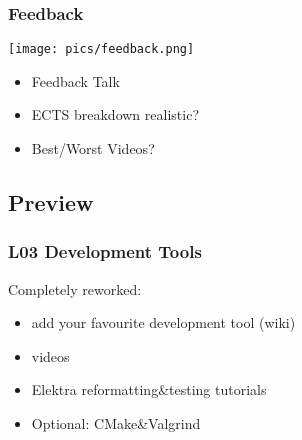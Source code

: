 \begin{frame}
	\frametitle{Feedback}

	\hfill \texttt{[image: pics/feedback.png]}
	\vspace{-1cm}
	\begin{itemize}
		\item Feedback Talk
		\item ECTS breakdown realistic?
		\item Best/Worst Videos?
	\end{itemize}
\end{frame}

\subsection{Preview}

\begin{frame}
	\frametitle{L03 Development Tools}

	Completely reworked:

	\begin{itemize}
	\item add your favourite development tool (wiki)
	\item videos
	\item Elektra reformatting\&testing tutorials
	\item Optional: CMake\&Valgrind
	\end{itemize}
\end{frame}



\nocite{raab2017introducing}

\appendix

\begin{frame}[allowframebreaks]
	
	
\end{frame}





